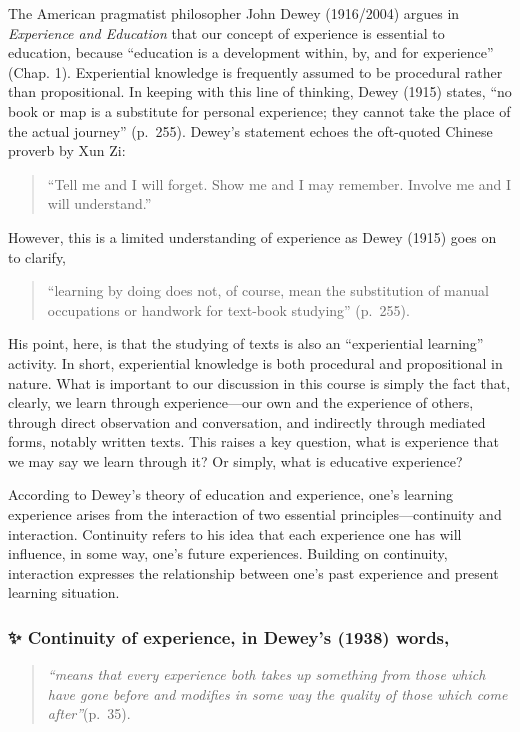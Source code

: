\documentclass[
]{book}
\begin{document}
The American pragmatist philosopher John Dewey (1916/2004) argues in \emph{Experience and Education} that our concept of experience is essential to education, because ``education is a development within, by, and for experience'' (Chap. 1). Experiential knowledge is frequently assumed to be procedural rather than propositional. In keeping with this line of thinking, Dewey (1915) states, ``no book or map is a substitute for personal experience; they cannot take the place of the actual journey'' (p.~255). Dewey's statement echoes the oft-quoted Chinese proverb by Xun Zi:

\begin{quote}
``Tell me and I will forget. Show me and I may remember. Involve me and I will understand.''
\end{quote}

However, this is a limited understanding of experience as Dewey (1915) goes on to clarify,

\begin{quote}
``learning by doing does not, of course, mean the substitution of manual occupations or handwork for text-book studying'' (p.~255).
\end{quote}

His point, here, is that the studying of texts is also an ``experiential learning'' activity. In short, experiential knowledge is both procedural and propositional in nature. What is important to our discussion in this course is simply the fact that, clearly, we learn through experience---our own and the experience of others, through direct observation and conversation, and indirectly through mediated forms, notably written texts. This raises a key question, what is experience that we may say we learn through it? Or simply, what is educative experience?

According to Dewey's theory of education and experience, one's learning experience arises from the interaction of two essential principles---continuity and interaction. Continuity refers to his idea that each experience one has will influence, in some way, one's future experiences. Building on continuity, interaction expresses the relationship between one's past experience and present learning situation.

\begin{blank}
\hypertarget{continuity-of-experience-in-deweys-1938-words}{%
\subsubsection{✨ Continuity of experience, in Dewey's (1938) words,}\label{continuity-of-experience-in-deweys-1938-words}}

\begin{quote}
\emph{``means that every experience both takes up something from those which have gone before and modifies in some way the quality of those which come after''}(p.~35).
\end{quote}
\end{blank}
\end{document}
